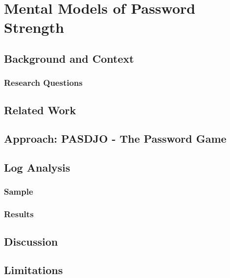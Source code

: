 \chapter[Mental Models of Password Strength]{Mental Models of Password Strength}\label{chap:pasdjo}


\section{Background and Context}

\subsection{Research Questions}

\section{Related Work}

\section{Approach: PASDJO - The Password Game}


\section{Log Analysis}

\subsection{Sample}
\subsection{Results}


\section{Discussion}


\section{Limitations}

